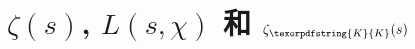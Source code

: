 \chapter{\texorpdfstring{$\zeta(s)$, $L(s,\chi)$ 和 $\zeta_{\texorpdfstring{K}{K}}(s)$}{zeta(s), L(s,chi) 和 zetaK(s)}}\label{ch:4}




